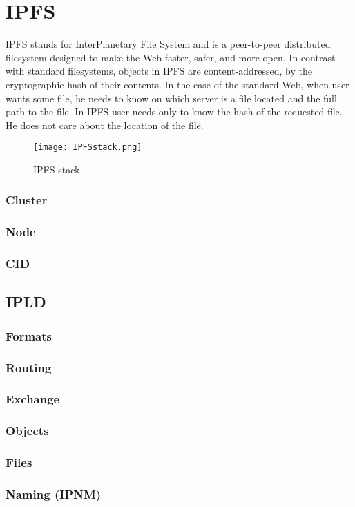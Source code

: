 \chapter{IPFS}

IPFS stands for InterPlanetary File System and is a peer-to-peer distributed filesystem designed to make the Web faster, safer, and more open. In contrast with standard filesystems, objects in IPFS are content-addressed, by the cryptographic hash of their contents. In the case of the standard Web, when user wants some file, he needs to know on which server is a file located and the full path to the file. In IPFS user needs only to know the hash of the requested file. He does not care about the location of the file.

\begin{figure}[h]
    \centering
    \texttt{[image: IPFSstack.png]}
    \caption{IPFS stack}
    \label{}
\end{figure}


\subsection{Cluster}
\subsection{Node}
\subsection{CID}



\section{IPLD}
\subsection{Formats} 
\subsection{Routing} 
\subsection{Exchange} 
\subsection{Objects}  
\subsection{Files}  
\subsection{Naming (IPNM)}



